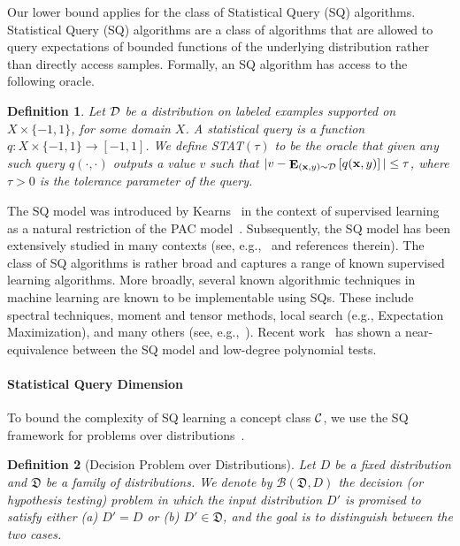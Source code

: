 \documentclass[10pt,a4paper]{article}
\newtheorem{definition}{Definition}[section]
\renewcommand\vec[1]{\mathbf{#1}}
\DeclareMathOperator*{\E}{\mathbf{E}}
\newcommand{\D}{D}
\newcommand{\1}{\Ind}
\begin{document}
Our lower bound applies for the class of Statistical Query (SQ) algorithms.
Statistical Query (SQ) algorithms are a class of algorithms that are allowed
to query expectations of bounded functions of the underlying distribution
rather than directly access samples. Formally, an SQ algorithm has access to the following oracle.

\begin{definition} \label{def:stat-oracle}\label{def:stat}
Let $\cal{D}$ be a distribution on labeled examples supported on $X \times \{-1, 1\}$, for some domain $X$.
A statistical query is a function $q: X \times \{-1, 1\} \to [-1, 1]$.  We define
\textsc{STAT}$(\tau)$ to be the oracle that given any such query $q(\cdot, \cdot)$
outputs a value $v$ such that $|v - \E_{(\vec x, y) \sim \cal{D}}\left[q(\vec x, y)\right]| \leq \tau$,
where $\tau>0$ is the tolerance parameter of the query.
\end{definition}

The SQ model was introduced by Kearns~\cite{Kearns:98} in the context of supervised learning as a
natural restriction of the PAC model~\cite{val84}.  Subsequently, the SQ model has been
extensively studied in many contexts (see, e.g.,~\cite{Feldman16b} and references therein).
The class of SQ algorithms is rather broad and captures a range of known supervised learning
algorithms.  More broadly, several known algorithmic techniques in machine learning are known to be
implementable using SQs. These include spectral techniques, moment and tensor methods, local search
(e.g., Expectation Maximization), and many others (see, e.g.,~\cite{FeldmanGRVX17, DBLP:journals/mor/FeldmanGV21}).
Recent work~\cite{BBHLS21} has shown a near-equivalence between the SQ model and low-degree
polynomial tests.



\paragraph{Statistical Query Dimension}
To bound the complexity of SQ learning a concept class $\cal C$,
we use the SQ framework for problems over distributions~\cite{FeldmanGRVX17}.
\begin{definition}[Decision Problem over Distributions] \label{def:decision}
    Let $\D$ be a fixed distribution and $\mathfrak D$ be a family of distributions.
    We denote by $\mathcal{B}(\mathfrak D, \D)$ the decision (or hypothesis testing) problem
    in which the input distribution $\D'$ is promised to satisfy either
    (a) $\D' = \D$ or (b) $\D' \in \mathfrak D$, and the goal
    is to distinguish between the two cases.
\end{definition}
\end{document}

